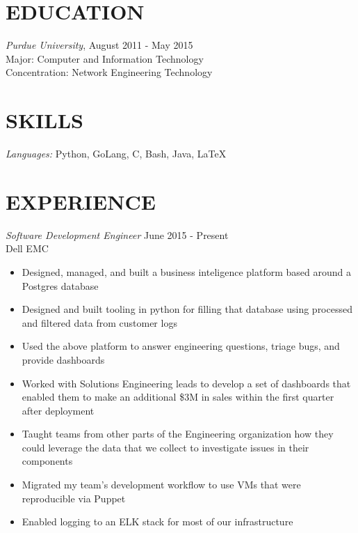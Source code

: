 \documentclass[line,margin]{res}
\begin{document}
  \name{\textcolor{TealBlue}{Ethan Madden}}
  \address{ethan@madden.ninja}
  \address{(812) 250-1419}

\begin{resume}
  \section{\textcolor{TealBlue}{EDUCATION}} 
    {\sl Purdue University}, \hfill August 2011 - May 2015 \\
      Major: Computer and Information Technology \\
      Concentration: Network Engineering Technology

  \section{\textcolor{TealBlue}{SKILLS}} 
    {\sl Languages:}  Python, GoLang, C, Bash, Java, \LaTeX \\

  \section{\textcolor{TealBlue}{EXPERIENCE}} 
    {\sl Software Development Engineer} \hfill June 2015 - Present \\
      Dell EMC
      \begin{itemize}  \itemsep -2pt
          \item Designed, managed, and built a business inteligence platform based around a Postgres database
          \item Designed and built tooling in python for filling that database using processed and filtered data from customer logs
          \item Used the above platform to answer engineering questions, triage bugs, and provide dashboards
          \item Worked with Solutions Engineering leads to develop a set of dashboards that enabled them to make an additional \$3M in sales within the first quarter after deployment
          \item Taught teams from other parts of the Engineering organization how they could leverage the data that we collect to investigate issues in their components
          \item Migrated my team's development workflow to use VMs that were reproducible via Puppet
          \item Enabled logging to an ELK stack for most of our infrastructure
      \end{itemize}


\end{resume}
\end{document}
